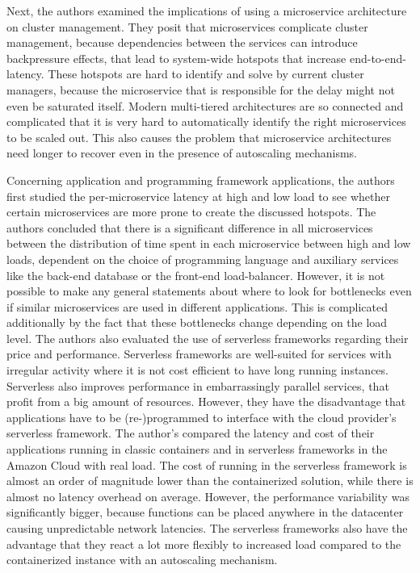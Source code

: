\documentclass[10pt]{article}
\begin{document}
	Next, the authors examined the implications of using a microservice architecture on cluster management. They posit that microservices complicate cluster management, because dependencies between the services can introduce backpressure effects, that lead to system-wide hotspots that increase end-to-end-latency. These hotspots are hard to identify and solve by current cluster managers, because the microservice that is responsible for the delay might not even be saturated itself. Modern multi-tiered architectures are so connected and complicated that it is very hard to automatically identify the right microservices to be scaled out. This also causes the problem that microservice architectures need longer to recover even in the presence of autoscaling mechanisms.
	
	Concerning application and programming framework applications, the authors first studied the per-microservice latency at high and low load to see whether certain microservices are more prone to create the discussed hotspots. The authors concluded that there is a significant difference in all microservices between the distribution of time spent in each microservice between high and low loads, dependent on the choice of programming language and auxiliary services like the back-end database or the front-end load-balancer. However, it is not possible to make any general statements about where to look for bottlenecks even if similar microservices are used in different applications. This is complicated additionally by the fact that these bottlenecks change depending on the load level. The authors also evaluated the use of serverless frameworks regarding their price and performance. Serverless frameworks are well-suited for services with irregular activity where it is not cost efficient to have long running instances. Serverless also improves performance in embarrassingly parallel services, that profit from a big amount of resources. However, they have the disadvantage that applications have to be (re-)programmed to interface with the cloud provider's serverless framework. The author's compared the latency and cost of their applications running in classic containers and in serverless frameworks in the Amazon Cloud with real load. The cost of running in the serverless framework is almost an order of magnitude lower than the containerized solution, while there is almost no latency overhead on average. However, the performance variability was significantly bigger, because functions can be placed anywhere in the datacenter causing unpredictable network latencies. The serverless frameworks also have the advantage that they react a lot more flexibly to increased load compared to the containerized instance with an autoscaling mechanism.
	
\end{document}
